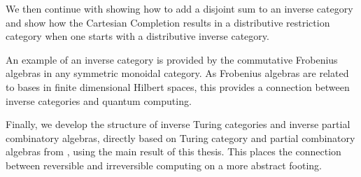 We then continue with showing how to add a disjoint sum to an inverse category and show how the
Cartesian Completion results in a distributive restriction category when one starts with a
distributive inverse category.

An example of an inverse category is provided by
the commutative Frobenius algebras in any symmetric monoidal category. As Frobenius algebras are
related to bases in finite dimensional Hilbert spaces\cite{coeckeetal08:ortho}, this provides a
connection between inverse categories and quantum computing.

Finally, we develop the structure of inverse Turing categories and inverse partial combinatory
algebras, directly based on Turing category and partial combinatory algebras  from
\cite{cockett-hostra08-intro-to-turing,cockett2010:categories-and-computability}, using the main
result of this thesis. This places the connection between reversible and irreversible
computing on a more abstract footing.




